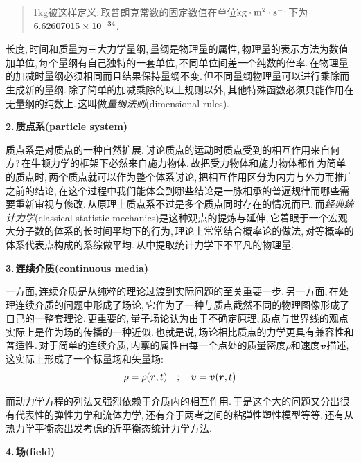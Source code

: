 \begin{verse}
1kg被这样定义:\,取普朗克常数的固定数值在单位$\rm kg\cdot m^2\cdot s^{-1}$下为$\rm 6.62607015\times 10^{-34}$.
\end{verse}

长度,\,时间和质量为三大力学量纲,\,量纲是物理量的属性,\,物理量的表示方法为数值加单位,\,每个量纲有自己独特的一套单位,\,不同单位间差一个纯数的倍率.\,在物理量的加减时量纲必须相同而且结果保持量纲不变.\,但不同量纲物理量可以进行乘除而生成新的量纲.\,除了简单的加减乘除的以上规则以外,\,其他特殊函数必须只能作用在无量纲的纯数上.\,这叫做\emph{量纲法则}(dimensional rules).

\vspace{0.2cm}
{\bf 2.\,质点系(particle system)}

质点系是对质点的一种自然扩展.\,讨论质点的运动时质点受到的相互作用来自何方?\,在牛顿力学的框架下必然来自施力物体.\,故把受力物体和施力物体都作为简单的质点时,\,两个质点就可以作为整个体系讨论,\,把相互作用区分为内力与外力而推广之前的结论,\,在这个过程中我们能体会到哪些结论是一脉相承的普遍规律而哪些需要重新审视与修改.\,从原理上质点系不过是多个质点同时存在的情况而已.\,而\emph{经典统计力学}(classical statistic mechanics)是这种观点的提炼与延伸,\,它着眼于一个宏观大分子数的体系的长时间平均下的行为,\,理论上常常结合概率论的做法,\,对等概率的体系代表点构成的系综做平均.\,从中提取统计力学下不平凡的物理量.

\vspace{0.2cm}
{\bf 3.\,连续介质(continuous media)}

一方面,\,连续介质是从纯粹的理论过渡到实际问题的至关重要一步.\,另一方面,\,在处理连续介质的问题中形成了场论,\,它作为了一种与质点截然不同的物理图像形成了自己的一整套理论.\,更重要的,\,量子场论认为由于不确定原理,\,质点与世界线的观点实际上是作为场的传播的一种近似.\,也就是说,\,场论相比质点的力学更具有兼容性和普适性.\,对于简单的连续介质,\,内禀的属性由每一个点处的质量密度$\rho$和速度$\boldsymbol{v}$描述,\,这实际上形成了一个标量场和矢量场:
\[\rho=\rho(\boldsymbol{r},t) \quad;\quad \boldsymbol{v}=\boldsymbol{v}(\boldsymbol{r},t)\]

而动力学方程的列法又强烈依赖于介质内的相互作用.\,于是这个大的问题又分出很有代表性的弹性力学和流体力学,\,还有介于两者之间的粘弹性塑性模型等等.\,还有从热力学平衡态出发考虑的近平衡态统计力学方法.

\vspace{0.2cm}
{\bf 4.\,场(field)}

